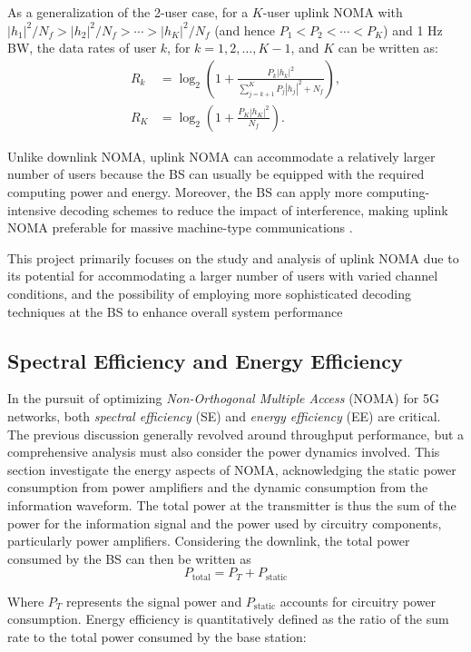 As a generalization of the 2-user case, for a $K$-user uplink NOMA with $|h_1|^2/N_f > |h_2|^2/N_f > \cdots > |h_K|^2/N_f$ (and hence $P_1 < P_2 < \cdots < P_K$) and 1 Hz BW, the data rates of user $k$, for $k = 1, 2, \ldots, K-1$, and $K$ can be written as:
\begin{align}
    R_k &= \log_2 \left(1 + \frac{P_k |h_k|^2}{\sum_{j=k+1}^K P_j |h_j|^2 + N_f}\right), \tag{2.11a} \\
    R_K &= \log_2 \left(1 + \frac{P_K |h_K|^2}{N_f}\right). \tag{2.11b}
\end{align}

Unlike downlink NOMA, uplink NOMA can accommodate a relatively larger number of users because the BS can usually be equipped with the required computing power and energy. Moreover, the BS can apply more computing-intensive decoding schemes to reduce the impact of interference, making uplink NOMA preferable for massive machine-type communications \cite{noma2}.

This project primarily focuses on the study and analysis of uplink NOMA due to its potential for accommodating a larger number of users with varied channel conditions, and the possibility of employing more sophisticated decoding techniques at the BS to enhance overall system performance
\subsection{Spectral Efficiency and Energy Efficiency}

In the pursuit of optimizing \textit{Non-Orthogonal Multiple Access} (NOMA) for 5G networks, both \textit{spectral efficiency} (SE) and \textit{energy efficiency} (EE) are critical. The previous discussion generally revolved around throughput performance, but a comprehensive analysis must also consider the power dynamics involved. This section investigate the energy aspects of NOMA, acknowledging the static power consumption from power amplifiers and the dynamic consumption from the information waveform. The total power at the transmitter is thus the sum of the power for the information signal and the power used by circuitry components, particularly power amplifiers.
Considering the downlink, the total power consumed by the BS can then be written as
\setcounter{equation}{11}
\begin{equation}
P_{\text{total}} = P_{T} + P_{\text{static}}
\end{equation}

Where \(P_{T}\) represents the signal power and \(P_{\text{static}}\) accounts for circuitry power consumption. Energy efficiency is quantitatively defined as the ratio of the sum rate to the total power consumed by the base station:

